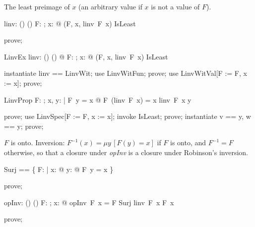 \documentclass{article}
\begin{document}
The least preimage of $x$ (an arbitrary value if $x$ is not a value of $F$).

\begin{axdef}
  linv: (\nat \fun \nat) \fun (\nat \fun \nat)
\where
   \forall F: \nat \fun \nat; x: \nat @ (F, x, linv~F~x) \in IsLeast
\end{axdef}

\begin{zproof}
prove;
\end{zproof}

\begin{theorem}{LinvEx}
  \exists linv: (\nat \fun \nat) \fun (\nat \fun \nat) @ \forall F: \nat \fun \nat; x: \nat @ (F, x, linv~F~x) \in IsLeast
\end{theorem}

\begin{zproof}
instantiate linv == LinvWit;
use LinvWitFun;
prove;
use LinvWitVal[F := F, x := x];
prove;
\end{zproof}

\begin{theorem}{LinvProp}
  \forall F: \nat \fun \nat; x, y: \nat | F~y = x @ F~(linv~F~x) = x \land linv~F~x \leq y
\end{theorem}

\begin{zproof}
prove;
use LinvSpec[F := F, x := x];
invoke IsLeast;
prove;
instantiate v == y, w == y;
prove;
\end{zproof}

$F$ is onto.  Inversion: $F^{-1}(x) = \mu y\,[F(y) = x]$ if $F$ is onto, and $F^{-1} = F$
otherwise, so that a closure under \textit{opInv} is a closure under Robinson's inversion.

\begin{zed}
  Surj == \{ F: \nat \fun \nat | \forall x: \nat @ \exists y: \nat @ F~y = x \}
\end{zed}

\begin{zproof}
prove;
\end{zproof}

\begin{axdef}
  opInv: (\nat \fun \nat) \fun (\nat \fun \nat)
\where
   \forall F: \nat \fun \nat; x: \nat @ opInv~F~x = \IF F \in Surj \THEN linv~F~x \ELSE F~x
\end{axdef}

\begin{zproof}
prove;
\end{zproof}
\end{document}
